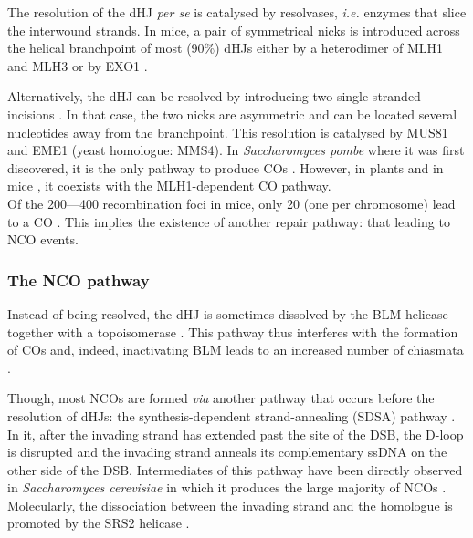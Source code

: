 The resolution of the dHJ \textit{per se} is catalysed by resolvases, \textit{i.e.} enzymes that slice the interwound strands.
In mice, a pair of symmetrical nicks is introduced across the helical branchpoint of most (90\%) dHJs either by a heterodimer of MLH1 \citep{baker1996involvement, edelmann1996meiotic} and MLH3 \citep{lipkin2002meiotic} or by EXO1 \citep{wei2003inactivationa}.

Alternatively, the dHJ can be resolved by introducing two single-stranded incisions \citep{wyatt2014holliday}. 
In that case, the two nicks are asymmetric and can be located several nucleotides away from the branchpoint. 
This resolution is catalysed by MUS81 and EME1 (yeast homologue: MMS4).
In \textit{Saccharomyces pombe} where it was first discovered, it is the only pathway to produce COs \citep{osman2003generating}.
However, in plants \citep{mercier2005two} and in mice \citep{holloway2008mus81}, it coexists with the MLH1-dependent CO pathway.\\


Of the 200—400 recombination foci in mice, only 20 (one per chromosome) lead to a CO \citep{baudat2007regulating}.
This implies the existence of another repair pathway: that leading to NCO events.


\subsubsection{The NCO pathway}
Instead of being resolved, the dHJ is sometimes dissolved by the BLM helicase together with a topoisomerase \citep{wu2003bloom}. 
This pathway thus interferes with the formation of COs and, indeed, inactivating BLM leads to an increased number of chiasmata \citep{holloway2010mammalian}.

Though, most NCOs are formed \textit{via} another pathway that occurs before the resolution of dHJs: the synthesis-dependent strand-annealing (SDSA) pathway \citep{allers2001differential}.
In it, after the invading strand has extended past the site of the DSB, the D-loop is disrupted and the invading strand anneals its complementary ssDNA on the other side of the DSB\@.
Intermediates of this pathway have been directly observed in \textit{Saccharomyces cerevisiae} \citep{mcmahill2007synthesisdependent} in which it produces the large majority of NCOs \citep{martini2011genomewide}.
Molecularly, the dissociation between the invading strand and the homologue is promoted by the SRS2 helicase \citep{ira2003srs2}.\\



